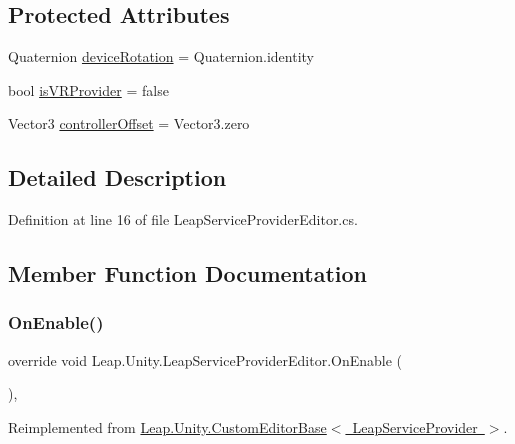 \subsection*{Protected Attributes}
\begin{DoxyCompactItemize}
\item 
Quaternion \mbox{\hyperlink{class_leap_1_1_unity_1_1_leap_service_provider_editor_a6d8c4c320f95c193100feccb73eda40c}{device\+Rotation}} = Quaternion.\+identity
\item 
bool \mbox{\hyperlink{class_leap_1_1_unity_1_1_leap_service_provider_editor_a278deb2ba3b172f743bd54d2515643bd}{is\+V\+R\+Provider}} = false
\item 
Vector3 \mbox{\hyperlink{class_leap_1_1_unity_1_1_leap_service_provider_editor_afc0676788bab922a1179d58946180c86}{controller\+Offset}} = Vector3.\+zero
\end{DoxyCompactItemize}


\subsection{Detailed Description}


Definition at line 16 of file Leap\+Service\+Provider\+Editor.\+cs.



\subsection{Member Function Documentation}
\mbox{\label{class_leap_1_1_unity_1_1_leap_service_provider_editor_ab843b1617ce2fff5b73493530fc4e959}} 
\subsubsection{\texorpdfstring{OnEnable()}{OnEnable()}}
{\footnotesize\ttfamily override void Leap.\+Unity.\+Leap\+Service\+Provider\+Editor.\+On\+Enable (\begin{DoxyParamCaption}{ }\end{DoxyParamCaption})\hspace{0.3cm}{\ttfamily [protected]}, {\ttfamily [virtual]}}



Reimplemented from \mbox{\hyperlink{class_leap_1_1_unity_1_1_custom_editor_base_a2268bc01655342bd3da5ae015bfa2f93}{Leap.\+Unity.\+Custom\+Editor\+Base$<$ Leap\+Service\+Provider $>$}}.



